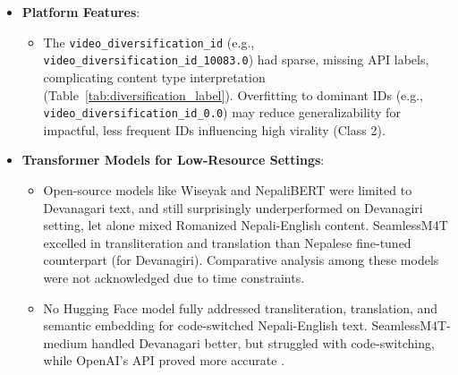 \documentclass[12pt,a4paper]{report}
\begin{document}
\begin{itemize}
    \item \textbf{Platform Features}:
        \begin{itemize}
            \item The \texttt{video\_diversification\_id} (e.g., \texttt{video\_diversification\_id\_10083.0}) had sparse, missing API labels, complicating content type interpretation (Table~\ref{tab:diversification_label}). Overfitting to dominant IDs (e.g., \texttt{video\_diversification\_id\_0.0}) may reduce generalizability for impactful, less frequent IDs influencing high virality (Class 2).
        \end{itemize}
\newpage
    \item \textbf{Transformer Models for Low-Resource Settings}:
        \begin{itemize}
            \item Open-source models like Wiseyak \parencite{duwal2024domainadaptativecontinuallearninglowresource} and NepaliBERT \parencite{Pudasaini2023NepaliBERT} were limited to Devanagari text, and still surprisingly underperformed on Devanagiri setting, let alone mixed Romanized Nepali-English content. SeamlessM4T \parencite{elbayad2023seamlessm4t, facebookresearch2023seamlessm4t, huggingface2024seamlessm4t} excelled in transliteration and translation than Nepalese fine-tuned counterpart (for Devanagiri). Comparative analysis among these models were not acknowledged due to time constraints.
            \item No Hugging Face model fully addressed transliteration, translation, and semantic embedding for code-switched Nepali-English text. SeamlessM4T-medium handled Devanagari better, but struggled with code-switching, while OpenAI’s API proved more accurate \parencite{reddit2023gpt4nepali}.
        \end{itemize}
\end{itemize}
\newpage
\end{document}
